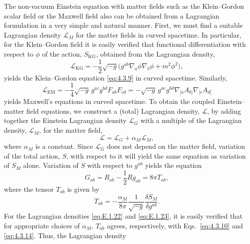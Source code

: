 The non-vacuum Einstein equation with matter fields such as the Klein--Gordon
scalar field or the Maxwell field also can be obtained from a Lagrangian formulation
in a very simple and natural manner. First, we must find a suitable Lagrangian
density \(\mathcal L_M\) for the matter fields in curved spacetime. In particular,
for the Klein--Gordon field it is easily verified that functional differentiation with
respect to \(\phi\) of the action, \(S_{\mathrm{KG}}\), obtained from the Lagrangian
density,
\begin{equation}
  \mathcal L_{\mathrm{KG}}
    =-\frac{1}{2}\sqrt{-g}
      \bigl(g^{ab}\nabla_a\phi\nabla_b\phi+m^2\phi^2\bigr),
  \tag{E.1.22}\label{eq:E.1.22}
\end{equation}
yields the Klein--Gordon equation \eqref{eq:4.3.9} in curved spacetime. Similarly,
\begin{equation}
  \mathcal L_{\mathrm{EM}}
    =-\frac{1}{4}\sqrt{-g}\,g^{ac}g^{bd}F_{ab}F_{cd}
    =-\sqrt{-g}\,g^{ac}g^{bd}\nabla_{[a}A_{b]}\nabla_{[c}A_{d]}
  \tag{E.1.23}\label{eq:E.1.23}
\end{equation}
yields Maxwell's equations in curved spacetime. To obtain the coupled
Einstein--matter field equations, we construct a (total) Lagrangian density,
\(\mathcal L\), by adding together the Einstein Lagrangian density \(\mathcal L_G\)
with a multiple of the Lagrangian density, \(\mathcal L_M\), for the matter field,
\begin{equation}
  \mathcal L=\mathcal L_G+\alpha_M\mathcal L_M,
  \tag{E.1.24}\label{eq:E.1.24}
\end{equation}
where \(\alpha_M\) is a constant. Since \(\mathcal L_G\) does not depend on the
matter field, variation of the total action, \(S\), with respect to it will yield the
same equation as variation of \(S_M\) alone. Variation of \(S\) with respect to
\(g^{ab}\) yields the equation
\begin{equation}
  G_{ab}=R_{ab}-\frac{1}{2}Rg_{ab}=8\pi T_{ab},
  \tag{E.1.25}\label{eq:E.1.25}
\end{equation}
where the tensor \(T_{ab}\) is given by
\begin{equation}
  T_{ab}=-\frac{\alpha_M}{8\pi}\frac{1}{\sqrt{-g}}
    \frac{\delta S_M}{\delta g^{ab}}.
  \tag{E.1.26}\label{eq:E.1.26}
\end{equation}
For the Lagrangian densities \eqref{eq:E.1.22} and \eqref{eq:E.1.23}, it is easily
verified that for appropriate choices of \(\alpha_M\), \(T_{ab}\) agrees, respectively,
with Eqs.~\eqref{eq:4.3.10} and \eqref{eq:4.3.14}. Thus, the Lagrangian density
